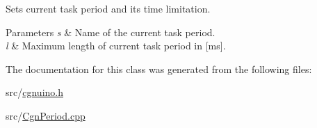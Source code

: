 Sets current task period and its time limitation. 


\begin{DoxyParams}{Parameters}
{\em s} & Name of the current task period. \\
\hline
{\em l} & Maximum length of current task period in \mbox{[}ms\mbox{]}. \\
\hline
\end{DoxyParams}


The documentation for this class was generated from the following files\+:\begin{DoxyCompactItemize}
\item 
src/\hyperlink{cgnuino_8h}{cgnuino.\+h}\item 
src/\hyperlink{CgnPeriod_8cpp}{Cgn\+Period.\+cpp}\end{DoxyCompactItemize}
